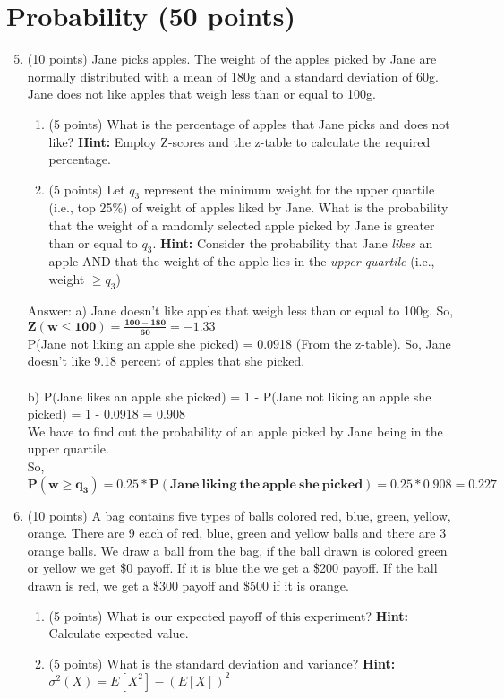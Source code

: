 \documentclass{article}%
\begin{document}
\section*{Probability (50 points)}
\begin{enumerate}
    \setcounter{enumi}{4}
    \item (10 points) Jane picks apples. The weight of the apples picked by Jane are normally distributed with a mean of 180g and a standard deviation of 60g. Jane does not like apples that weigh less than or equal to 100g. 
    \begin{enumerate}
        \item (5 points) What is the percentage of apples that Jane picks and does not like? \textbf{Hint:} Employ Z-scores and the z-table to calculate the required percentage.
        \item (5 points) Let $q_3$ represent the minimum weight for the upper quartile (i.e., top 25\%) of weight of apples  liked by Jane. What is the probability that the weight of a randomly selected apple picked by Jane is greater than or equal to $q_3$. \textbf{Hint:} Consider the probability that Jane \emph{likes} an apple AND that the weight of the apple lies in the \emph{upper quartile} (i.e., weight $\geq q_3$)
    \end{enumerate}

    Answer: a) Jane doesn't like apples that weigh less than or equal to 100g. So, $\mathbf{ Z(w \le 100) = \frac{100 - 180}{60} = -1.33 }$ \\
    P(Jane not liking an apple she picked) = 0.0918 (From the z-table). So, Jane doesn't like 9.18 percent of apples that she picked. \\ \\
    b) P(Jane likes an apple she picked) = 1 - P(Jane not liking an apple she picked) = 1 - 0.0918 = 0.908 \\
    We have to find out the probability of an apple picked by Jane being in the upper quartile. \\
    So, $\mathbf{ P(w \ge q_3) = 0.25 * P(Jane \ liking \ the \ apple \ she \ picked) = 0.25 * 0.908 = 0.227 }$


    \item (10 points) A bag contains five types of balls colored red, blue, green, yellow, orange. There are 9 each of red, blue, green and yellow balls and there are 3 orange balls. We draw a ball from the bag, if the ball drawn is colored green or yellow we get \$0 payoff. If it is blue the we get a \$200 payoff. If the ball drawn is red, we get a \$300 payoff and \$500 if it is orange.
    \begin{enumerate}
        \item (5 points) What is our expected payoff of this experiment? \textbf{Hint:} Calculate expected value.
        \item (5 points) What is the standard deviation and variance? \textbf{Hint:} $\sigma^2(X) = E[X^2] - (E[X])^2$
    \end{enumerate}


\end{enumerate}
\end{document}
